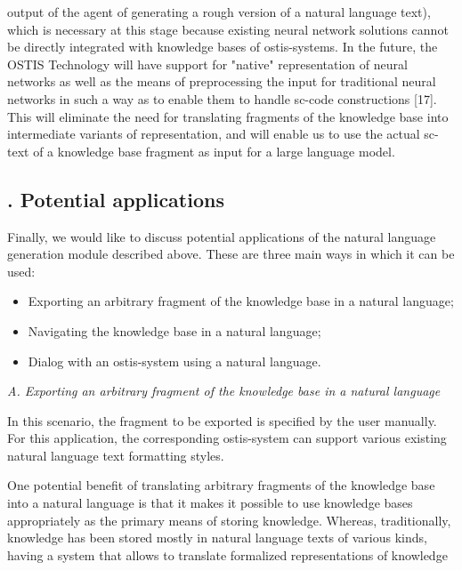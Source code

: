 \documentclass[twocolumn]{scndocument}
\newcommand{\RNumb}[1]{\uppercase\expandafter{\romannumeral #1\relax}}
\begin{document}
output of the agent of generating a rough version of
a natural language text), which is necessary at this
stage because existing neural network solutions cannot be
directly integrated with knowledge bases of ostis-systems.
In the future, the OSTIS Technology will have support
for "native" representation of neural networks as well
as the means of preprocessing the input for traditional
neural networks in such a way as to enable them to
handle sc-code constructions [17]. This will eliminate the
need for translating fragments of the knowledge base into
intermediate variants of representation, and will enable
us to use the actual sc-text of a knowledge base fragment
as input for a large language model.
\vspace{0.8mm}\begin{center}
 \section{\RNumb{4}. Potential applications}  
\end{center}\vspace{0.8mm}
\par Finally, we would like to discuss potential applications
of the natural language generation module described
above. These are three main ways in which it can be
used:
\begin{itemize} 
 \item Exporting an arbitrary fragment of the knowledge
   base in a natural language;
 \item Navigating the knowledge base in a natural language;
 \item Dialog with an ostis-system using a natural language.
 \end{itemize}
\newpage \noindent \textit{A. Exporting an arbitrary fragment of the knowledge
base in a natural language}
\par \vspace{2mm} In this scenario, the fragment to be exported is specified by the user manually. For this application, the
corresponding ostis-system can support various existing
natural language text formatting styles.
\par One potential benefit of translating arbitrary fragments
of the knowledge base into a natural language is that it
makes it possible to use knowledge bases appropriately
as the primary means of storing knowledge. Whereas,
traditionally, knowledge has been stored mostly in natural
language texts of various kinds, having a system that allows to translate formalized representations of knowledge
\end{document}
